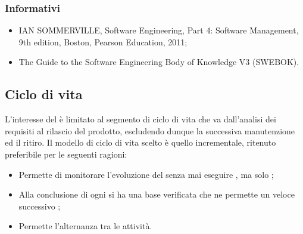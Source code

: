 \subsubsection{Informativi}
\begin{itemize}
\item IAN SOMMERVILLE, Software Engineering, Part 4: Software Management, 9th edition, Boston, Pearson Education, 2011;
\item The Guide to the Software Engineering Body of Knowledge V3 (SWEBOK).
\end{itemize}

\subsection{Ciclo di vita}
L’interesse del  è limitato al segmento di ciclo di vita che va dall’analisi dei requisiti al
rilascio del prodotto, escludendo dunque la successiva manutenzione ed il ritiro. Il modello di ciclo di
vita scelto \`e quello incrementale, ritenuto preferibile per le seguenti ragioni:
\begin{itemize}
\item Permette di monitorare l'evoluzione del  senza mai eseguire , ma solo ;
\item Alla conclusione di ogni  si ha una base verificata che ne permette un veloce successivo ;
\item Permette l'alternanza tra le attivit\`a.
\end{itemize}

